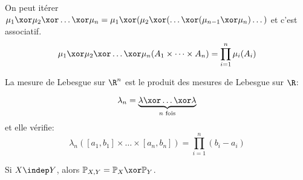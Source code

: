 \begin{remarque}
	On peut itérer $\mu_1 \xor \mu_2 \xor \dots \xor \mu_n = \mu_1 \xor (\mu_2 \xor (\dots \xor (\mu_{n-1} \xor \mu_n)\dots)$ et c'est associatif.
	$$ \mu_1 \xor \mu_2 \xor \dots \xor \mu_n(A_1 \times \dots \times A_n) = \prod_{i=1}^n \mu_i(A_i) $$
\end{remarque}


\begin{exemple}
	La mesure de Lebesgue sur $\R^n$ est le produit des mesures de Lebesgue sur $\R$:

	$$\lambda_n = \underbrace{\lambda \xor \dots \xor \lambda}_{n \text{ fois}}$$
	et elle vérifie:
	$$\lambda_n([a_1, b_1] \times \dots \times [a_n, b_n]) = \prod_{i=1}^n (b_i - a_i)$$
\end{exemple}

\begin{remarque}
	Si $X \indep Y$, alors $\mathbb{P}_{X,Y} = \mathbb{P}_X \xor \mathbb{P}_Y$.
\end{remarque}
